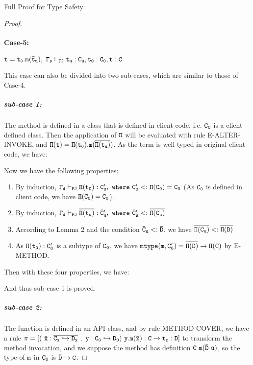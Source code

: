 \begin{section}{Full Proof for Type Safety}
\begin{proof}
\paragraph{Case-5:}
$\tt t=t_0.m(\bar{t}_u),\ \Gamma_s\vdash_{FJ} t_u:C_u, t_0:C_0, t:C$
\par 
This case can also be divided into two sub-cases, which are similar to those of Case-4.
\subparagraph{sub-case 1:} 
The method is defined in a class that is defined in client code, i.e. $\tt C_0$ is a client-defined class. Then the application of $\tt\Pi$ will be evaluated with rule E-ALTER-INVOKE, and $\tt\Pi(t)=\Pi(t_0).m(\overline{\Pi(t_u)})$. As the term is well typed in original client code, we have:
\begin{center}
\noLine
{}
\DP
\end{center}
Now we have the following properties:
\begin{enumerate}
\item By induction, $\tt\Gamma_d\vdash_{FJ}\Pi(t_0):C'_0,\ where\ C'_0<:\Pi(C_0)=C_0$ (As $\tt C_0$ is defined in client code, we have $\tt \Pi(C_0)=C_0$).
\item By induction, $\tt\Gamma_d\vdash_{FJ}\overline{\Pi(t_u)} :\bar{C}'_u,\ where\ \bar{C}'_u <: \overline{\Pi(C_u)}$
\item According to Lemma 2 and the condition $\tt\bar{C}_u<:\bar{D}$, we have $\tt \overline{\Pi(C_u)}<:\overline{\Pi(D)}$
\item As $\tt \Pi(t_0):C'_0$ is a subtype of $\tt C_0$, we have $\tt mtype(m,C'_0)=\overline{\Pi(D)}\rightarrow \Pi(C)$ by E-METHOD.
\end{enumerate}
Then with these four properties, we have:
\begin{center}
\noLine
{}
\DP
\end{center}
And thus sub-case 1 is proved.
\subparagraph{sub-case 2:}
The function is defined in an API class, and by rule METHOD-COVER, we have a rule 
$\tt \pi=[(~\bar{x}:\overline{C_x\hookrightarrow D_x}~,~y:C_0\hookrightarrow D_0)\ y.m(\bar{x}):C \rightarrow t_r:D]$ to transform the method invocation, and we suppose the method has definition $\tt C\ m(\bar{D}\ \bar{u})$, so the type of $\tt m$ in $\tt C_0$ is $\tt\bar{D}\rightarrow C$.

\end{proof}
\end{section}
